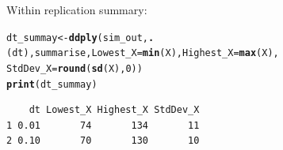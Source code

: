 \documentclass{article}\usepackage[]{graphicx}\usepackage[]{color}
\makeatletter
\newcommand{\hlnum}[1]{\textcolor[rgb]{0.686,0.059,0.569}{#1}}%
\newcommand{\hlstd}[1]{\textcolor[rgb]{0.345,0.345,0.345}{#1}}%
\newcommand{\hlkwb}[1]{\textcolor[rgb]{0.69,0.353,0.396}{#1}}%
\newcommand{\hlkwc}[1]{\textcolor[rgb]{0.333,0.667,0.333}{#1}}%
\newcommand{\hlkwd}[1]{\textcolor[rgb]{0.737,0.353,0.396}{\textbf{#1}}}%
\newenvironment{kframe}{%
 \def\at@end@of@kframe{}%
 \ifinner\ifhmode%
  \def\at@end@of@kframe{\end{minipage}}%
  \begin{minipage}{\columnwidth}%
 \fi\fi%
 \def\FrameCommand##1{\hskip\@totalleftmargin \hskip-\fboxsep
 \colorbox{shadecolor}{##1}\hskip-\fboxsep
     \hskip-\linewidth \hskip-\@totalleftmargin \hskip\columnwidth}%
 \MakeFramed {\advance\hsize-\width
   \@totalleftmargin\z@ \linewidth\hsize
   \@setminipage}}%
 {\par\unskip\endMakeFramed%
 \at@end@of@kframe}
\newenvironment{knitrout}{}{} %
\makeatother
\begin{document}
\begin{knitrout}
\end{knitrout}


Within replication summary:
\begin{knitrout}
\color{fgcolor}\begin{kframe}
\begin{alltt}
\hlstd{dt_summay} \hlkwb{<-} \hlkwd{ddply}\hlstd{(sim_out,} \hlkwd{.}\hlstd{(dt), summarise,} \hlkwc{Lowest_X} \hlstd{=} \hlkwd{min}\hlstd{(X),} \hlkwc{Highest_X} \hlstd{=} \hlkwd{max}\hlstd{(X),}
    \hlkwc{StdDev_X} \hlstd{=} \hlkwd{round}\hlstd{(}\hlkwd{sd}\hlstd{(X),} \hlnum{0}\hlstd{))}
\hlkwd{print}\hlstd{(dt_summay)}
\end{alltt}
\begin{verbatim}
    dt Lowest_X Highest_X StdDev_X
1 0.01       74       134       11
2 0.10       70       130       10
\end{verbatim}
\end{kframe}
\end{knitrout}
\end{document}
